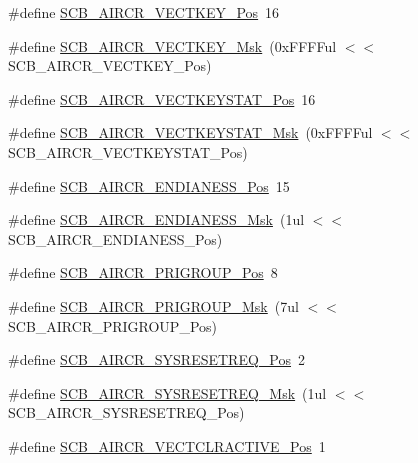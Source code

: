 \begin{DoxyCompactItemize}
\item 
\#define \hyperlink{group__CMSIS__CM3__SCB_gaaa27c0ba600bf82c3da08c748845b640}{S\+C\+B\+\_\+\+A\+I\+R\+C\+R\+\_\+\+V\+E\+C\+T\+K\+E\+Y\+\_\+\+Pos}~16
\item 
\#define \hyperlink{group__CMSIS__CM3__SCB_ga90c7cf0c490e7ae55f9503a7fda1dd22}{S\+C\+B\+\_\+\+A\+I\+R\+C\+R\+\_\+\+V\+E\+C\+T\+K\+E\+Y\+\_\+\+Msk}~(0x\+F\+F\+F\+Ful $<$$<$ S\+C\+B\+\_\+\+A\+I\+R\+C\+R\+\_\+\+V\+E\+C\+T\+K\+E\+Y\+\_\+\+Pos)
\item 
\#define \hyperlink{group__CMSIS__CM3__SCB_gaec404750ff5ca07f499a3c06b62051ef}{S\+C\+B\+\_\+\+A\+I\+R\+C\+R\+\_\+\+V\+E\+C\+T\+K\+E\+Y\+S\+T\+A\+T\+\_\+\+Pos}~16
\item 
\#define \hyperlink{group__CMSIS__CM3__SCB_gabacedaefeefc73d666bbe59ece904493}{S\+C\+B\+\_\+\+A\+I\+R\+C\+R\+\_\+\+V\+E\+C\+T\+K\+E\+Y\+S\+T\+A\+T\+\_\+\+Msk}~(0x\+F\+F\+F\+Ful $<$$<$ S\+C\+B\+\_\+\+A\+I\+R\+C\+R\+\_\+\+V\+E\+C\+T\+K\+E\+Y\+S\+T\+A\+T\+\_\+\+Pos)
\item 
\#define \hyperlink{group__CMSIS__CM3__SCB_gad31dec98fbc0d33ace63cb1f1a927923}{S\+C\+B\+\_\+\+A\+I\+R\+C\+R\+\_\+\+E\+N\+D\+I\+A\+N\+E\+S\+S\+\_\+\+Pos}~15
\item 
\#define \hyperlink{group__CMSIS__CM3__SCB_ga2f571f93d3d4a6eac9a3040756d3d951}{S\+C\+B\+\_\+\+A\+I\+R\+C\+R\+\_\+\+E\+N\+D\+I\+A\+N\+E\+S\+S\+\_\+\+Msk}~(1ul $<$$<$ S\+C\+B\+\_\+\+A\+I\+R\+C\+R\+\_\+\+E\+N\+D\+I\+A\+N\+E\+S\+S\+\_\+\+Pos)
\item 
\#define \hyperlink{group__CMSIS__CM3__SCB_gaca155deccdeca0f2c76b8100d24196c8}{S\+C\+B\+\_\+\+A\+I\+R\+C\+R\+\_\+\+P\+R\+I\+G\+R\+O\+U\+P\+\_\+\+Pos}~8
\item 
\#define \hyperlink{group__CMSIS__CM3__SCB_ga8be60fff03f48d0d345868060dc6dae7}{S\+C\+B\+\_\+\+A\+I\+R\+C\+R\+\_\+\+P\+R\+I\+G\+R\+O\+U\+P\+\_\+\+Msk}~(7ul $<$$<$ S\+C\+B\+\_\+\+A\+I\+R\+C\+R\+\_\+\+P\+R\+I\+G\+R\+O\+U\+P\+\_\+\+Pos)
\item 
\#define \hyperlink{group__CMSIS__CM3__SCB_gaffb2737eca1eac0fc1c282a76a40953c}{S\+C\+B\+\_\+\+A\+I\+R\+C\+R\+\_\+\+S\+Y\+S\+R\+E\+S\+E\+T\+R\+E\+Q\+\_\+\+Pos}~2
\item 
\#define \hyperlink{group__CMSIS__CM3__SCB_gaae1181119559a5bd36e62afa373fa720}{S\+C\+B\+\_\+\+A\+I\+R\+C\+R\+\_\+\+S\+Y\+S\+R\+E\+S\+E\+T\+R\+E\+Q\+\_\+\+Msk}~(1ul $<$$<$ S\+C\+B\+\_\+\+A\+I\+R\+C\+R\+\_\+\+S\+Y\+S\+R\+E\+S\+E\+T\+R\+E\+Q\+\_\+\+Pos)
\item 
\#define \hyperlink{group__CMSIS__CM3__SCB_gaa30a12e892bb696e61626d71359a9029}{S\+C\+B\+\_\+\+A\+I\+R\+C\+R\+\_\+\+V\+E\+C\+T\+C\+L\+R\+A\+C\+T\+I\+V\+E\+\_\+\+Pos}~1
$$
\end{DoxyCompactItemize}
